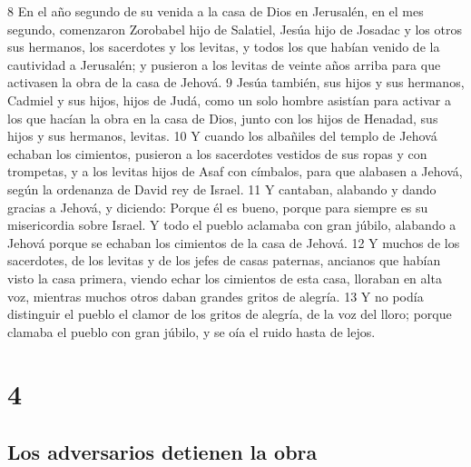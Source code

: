 8 En el año segundo de su venida a la casa de Dios en Jerusalén, en el mes segundo, comenzaron Zorobabel hijo de Salatiel, Jesúa hijo de Josadac y los otros sus hermanos, los sacerdotes y los levitas, y todos los que habían venido de la cautividad a Jerusalén; y pusieron a los levitas de veinte años arriba para que activasen la obra de la casa de Jehová.
9 Jesúa también, sus hijos y sus hermanos, Cadmiel y sus hijos, hijos de Judá, como un solo hombre asistían para activar a los que hacían la obra en la casa de Dios, junto con los hijos de Henadad, sus hijos y sus hermanos, levitas.
10 Y cuando los albañiles del templo de Jehová echaban los cimientos, pusieron a los sacerdotes vestidos de sus ropas y con trompetas, y a los levitas hijos de Asaf con címbalos, para que alabasen a Jehová, según la ordenanza de David rey de Israel. 
11 Y cantaban, alabando y dando gracias a Jehová, y diciendo: Porque él es bueno, porque para siempre es su misericordia sobre Israel. Y todo el pueblo aclamaba con gran júbilo, alabando a Jehová porque se echaban los cimientos de la casa de Jehová.
12 Y muchos de los sacerdotes, de los levitas y de los jefes de casas paternas, ancianos que habían visto la casa primera, viendo echar los cimientos de esta casa, lloraban en alta voz, mientras muchos otros daban grandes gritos de alegría.
13 Y no podía distinguir el pueblo el clamor de los gritos de alegría, de la voz del lloro; porque clamaba el pueblo con gran júbilo, y se oía el ruido hasta de lejos.

\chapter{4}

\section*{Los adversarios detienen la obra}


